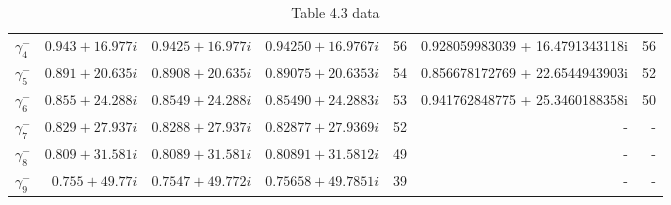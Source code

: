 \begin{table}
\begin{adjustbox}{width=1\textwidth}
\begin{tabular}{c | r | r | r | r | r | r}
 $\gamma_4^{-}$ & $ 0.943 + 16.977 i $ & $ 0.9425 + 16.977 i$ & $ 0.94250  + 16.9767 i$ & 56  &0.928059983039 +  16.4791343118i& 56  \\
 $\gamma_5^{-}$ & $ 0.891 + 20.635 i $ & $ 0.8908 + 20.635 i$ & $ 0.89075  + 20.6353 i$ & 54  &0.856678172769 +  22.6544943903i & 52 \\
 $\gamma_6^{-}$ & $ 0.855 + 24.288 i $ & $ 0.8549 + 24.288 i$ & $ 0.85490  + 24.2883 i$ & 53  &0.941762848775 +  25.3460188358i & 50 \\
 $\gamma_7^{-}$ & $ 0.829 + 27.937 i $ & $ 0.8288 + 27.937 i$ & $ 0.82877  + 27.9369 i$ & 52  &- & - \\
 $\gamma_8^{-}$ & $ 0.809 + 31.581 i $ & $ 0.8089 + 31.581 i$ & $ 0.80891  + 31.5812 i$ & 49  &- & - \\
 $\gamma_9^{-}$ & $ 0.755 + 49.77  i $ & $ 0.7547 + 49.772 i$ & $ 0.75658  + 49.7851 i$ & 39  &- & - \\ \hline
 \end{tabular}
\end{adjustbox}
 \caption{Table 4.3 data}
 \label{Table43}
\end{table}

